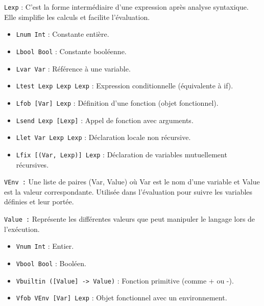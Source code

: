 \documentclass{article}
\begin{document}
\texttt{Lexp} : C’est la forme intermédiaire d’une expression après analyse syntaxique. Elle simplifie les calculs et facilite l'évaluation.
\begin{itemize}
    \item \texttt{Lnum Int} : Constante entière.
    \item \texttt{Lbool Bool} : Constante booléenne.
    \item \texttt{Lvar Var} : Référence à une variable.
    \item \texttt{Ltest Lexp Lexp Lexp} : Expression conditionnelle (équivalente à if).
    \item \texttt{Lfob [Var] Lexp} : Définition d'une fonction (objet fonctionnel).
    \item \texttt{Lsend Lexp [Lexp]} : Appel de fonction avec arguments.
    \item \texttt{Llet Var Lexp Lexp} : Déclaration locale non récursive.
    \item \texttt{Lfix [(Var, Lexp)] Lexp} : Déclaration de variables mutuellement récursives. \newline
\end{itemize} 

\texttt{VEnv :} Une liste de paires (Var, Value) où Var est le nom d’une variable et Value est la valeur correspondante. Utilisée dans l’évaluation pour suivre les variables définies et leur portée. \newline

\texttt{Value :} Représente les différentes valeurs que peut manipuler le langage lors de l’exécution.
\begin{itemize}
    \item \texttt{Vnum Int} : Entier.
    \item \texttt{Vbool Bool} : Booléen.
    \item \texttt{Vbuiltin ([Value] -> Value)} : Fonction primitive (comme + ou -).
    \item \texttt{Vfob VEnv [Var] Lexp} : Objet fonctionnel avec un environnement.
\end{itemize}
\end{document}
